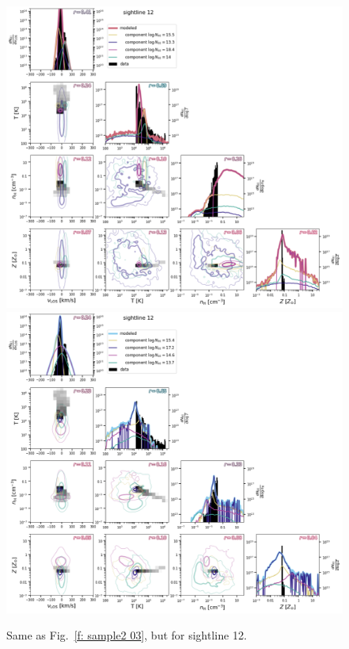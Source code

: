 \documentclass[fleqn,usenatbib]{mnras}
\begin{document}
\begin{figure}
    \centering
    \includegraphics[height=0.45\textheight]{figures/sample2/original/sightline_0012.png}
    \includegraphics[height=0.45\textheight]{figures/sample2/high-z/sightline_0012.png}
    \label{f: sample2 12}
    \caption{Same as Fig.~\ref{f: sample2 03}, but for sightline 12.}
\end{figure}
\end{document}
